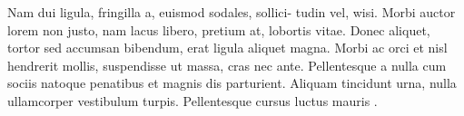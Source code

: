 \documentclass[twocolumn]{aastex631}
\begin{document}
Nam dui ligula, fringilla a, euismod sodales, sollici- tudin vel, wisi.
Morbi auctor lorem non justo, nam lacus libero, pretium at, lobortis vitae.
Donec aliquet, tortor sed accumsan bibendum, erat ligula aliquet magna.
Morbi ac orci et nisl hendrerit mollis, suspendisse ut massa, cras nec ante.
Pellentesque a nulla cum sociis natoque penatibus et magnis dis parturient.
Aliquam tincidunt urna, nulla ullamcorper vestibulum turpis.
Pellentesque cursus luctus mauris \citep{Luger2021}.


\end{document}
